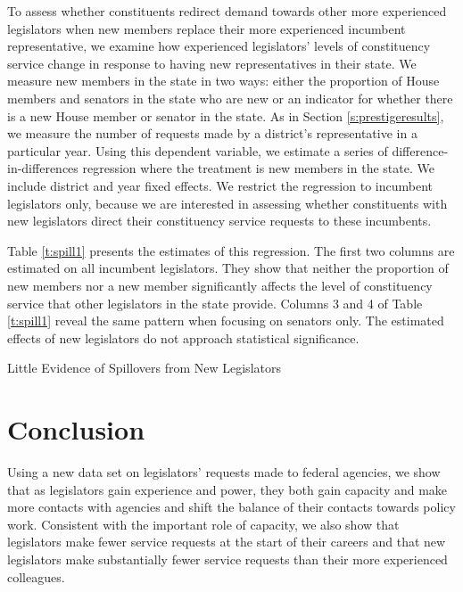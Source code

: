 \documentclass[12pt]{article}
\begin{document}
To assess whether constituents redirect demand towards other more experienced legislators when new members replace their more experienced incumbent representative, we examine how experienced legislators' levels of constituency service change in response to having new representatives in their state. We measure new members in the state in two ways: either the proportion of House members and senators in the state who are new or an indicator for whether there is a new House member or senator in the state. As in Section \ref{s:prestigeresults}, we measure the number of requests made by a district's representative in a particular year. Using this dependent variable, we estimate a series of difference-in-differences regression where the treatment is new members in the state. We include district and year fixed effects. We restrict the regression to incumbent legislators only, because we are interested in assessing whether constituents with new legislators direct their constituency service requests to these incumbents.   

Table \ref{t:spill1} presents the estimates of this regression. The first two columns are estimated on all incumbent legislators. They show that neither the proportion of new members nor a new member significantly affects the level of constituency service that other legislators in the state provide. Columns 3 and 4 of Table \ref{t:spill1} reveal the same pattern when focusing on senators only. The estimated effects of new legislators do not approach statistical significance.  

   

\begin{table}[hbt!]
\caption{Little Evidence of Spillovers from New Legislators} \label{t:spill1}

\begin{minipage}{\textwidth}
\begin{center}

\end{center}
\end{minipage}
\end{table}


\section{Conclusion} \label{s:conclude}
Using a new data set on legislators' requests made to federal agencies, we show that as legislators gain experience and power, they both gain capacity and make more contacts with agencies and shift the balance of their contacts towards policy work. Consistent with the important role of capacity, we also show that legislators make fewer service requests at the start of their careers and that new legislators make substantially fewer service requests than their more experienced colleagues. 
\end{document}
